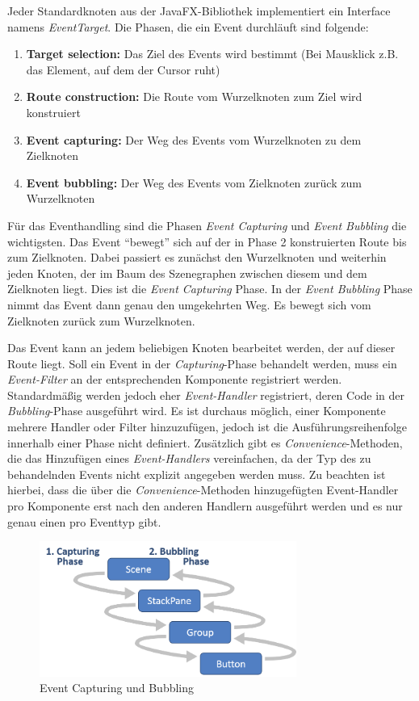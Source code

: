 Jeder Standardknoten aus der JavaFX-Bibliothek implementiert ein Interface namens \textit{EventTarget}. Die Phasen, die ein Event durchläuft sind folgende:
\begin{enumerate}
	\item \textbf{Target selection:} Das Ziel des Events wird bestimmt (Bei Mausklick z.B. das Element, auf dem der Cursor ruht)
	\item \textbf{Route construction:} Die Route vom Wurzelknoten zum Ziel wird konstruiert
	\item \textbf{Event capturing:} Der Weg des Events vom Wurzelknoten zu dem Zielknoten
	\item \textbf{Event bubbling:} Der Weg des Events vom Zielknoten zurück zum Wurzelknoten \cite{Gordon2013}
\end{enumerate}
Für das Eventhandling sind die Phasen \textit{Event Capturing} und \textit{Event Bubbling} die wichtigsten. Das Event \enquote{bewegt} sich auf der in Phase 2 konstruierten Route bis zum Zielknoten. Dabei passiert es zunächst den Wurzelknoten und weiterhin jeden Knoten, der im Baum des Szenegraphen zwischen diesem und dem Zielknoten liegt. Dies ist die \textit{Event Capturing} Phase. In der \textit{Event Bubbling} Phase nimmt das Event dann genau den umgekehrten Weg. Es bewegt sich vom Zielknoten zurück zum Wurzelknoten.\par
Das Event kann an jedem beliebigen Knoten bearbeitet werden, der auf dieser Route liegt. Soll ein Event in der \textit{Capturing}-Phase behandelt werden, muss ein \textit{Event-Filter} an der entsprechenden Komponente registriert werden. Standardmäßig werden jedoch eher \textit{Event-Handler} registriert, deren Code in der \textit{Bubbling}-Phase ausgeführt wird. Es ist durchaus möglich, einer Komponente mehrere Handler oder Filter hinzuzufügen, jedoch ist die Ausführungsreihenfolge innerhalb einer Phase nicht definiert. Zusätzlich gibt es \textit{Convenience}-Methoden, die das Hinzufügen eines \textit{Event-Handlers} vereinfachen, da der Typ des zu behandelnden Events nicht explizit angegeben werden muss. Zu beachten ist hierbei, dass die über die \textit{Convenience}-Methoden hinzugefügten Event-Handler pro Komponente erst nach den anderen Handlern ausgeführt werden und es nur genau einen pro Eventtyp gibt. \cite{Gordon2013}\par
\begin{figure}[H]
 \centering
 \includegraphics[width=0.75\textwidth]{grafiken/event_phase.png}
 \caption{Event Capturing und Bubbling}
 \label{fig:eventPhase}
\end{figure} 
